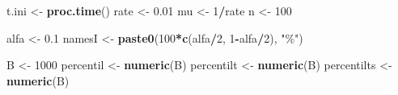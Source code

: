 \documentclass[
]{book}
\newenvironment{Shaded}{\begin{snugshade}}{\end{snugshade}}
\newcommand{\DecValTok}[1]{\textcolor[rgb]{0.00,0.00,0.81}{#1}}
\newcommand{\FloatTok}[1]{\textcolor[rgb]{0.00,0.00,0.81}{#1}}
\newcommand{\FunctionTok}[1]{\textcolor[rgb]{0.13,0.29,0.53}{\textbf{#1}}}
\newcommand{\NormalTok}[1]{#1}
\newcommand{\OtherTok}[1]{\textcolor[rgb]{0.56,0.35,0.01}{#1}}
\newcommand{\SpecialCharTok}[1]{\textcolor[rgb]{0.81,0.36,0.00}{\textbf{#1}}}
\newcommand{\StringTok}[1]{\textcolor[rgb]{0.31,0.60,0.02}{#1}}
\theoremstyle{break}
\theoremstyle{nonumberplain}
\begin{document}
\begin{Shaded}
\begin{Highlighting}[]
\NormalTok{t.ini }\OtherTok{\textless{}{-}} \FunctionTok{proc.time}\NormalTok{()}
\NormalTok{rate }\OtherTok{\textless{}{-}} \FloatTok{0.01}
\NormalTok{mu }\OtherTok{\textless{}{-}} \DecValTok{1}\SpecialCharTok{/}\NormalTok{rate}
\NormalTok{n }\OtherTok{\textless{}{-}} \DecValTok{100}

\NormalTok{alfa }\OtherTok{\textless{}{-}} \FloatTok{0.1}
\NormalTok{namesI }\OtherTok{\textless{}{-}} \FunctionTok{paste0}\NormalTok{(}\DecValTok{100}\SpecialCharTok{*}\FunctionTok{c}\NormalTok{(alfa}\SpecialCharTok{/}\DecValTok{2}\NormalTok{, }\DecValTok{1}\SpecialCharTok{{-}}\NormalTok{alfa}\SpecialCharTok{/}\DecValTok{2}\NormalTok{), }\StringTok{"\%"}\NormalTok{)}

\NormalTok{B }\OtherTok{\textless{}{-}} \DecValTok{1000}
\NormalTok{percentil }\OtherTok{\textless{}{-}} \FunctionTok{numeric}\NormalTok{(B)}
\NormalTok{percentilt }\OtherTok{\textless{}{-}} \FunctionTok{numeric}\NormalTok{(B)}
\NormalTok{percentilts }\OtherTok{\textless{}{-}} \FunctionTok{numeric}\NormalTok{(B)}


\end{Highlighting}
\end{Shaded}
\end{document}
